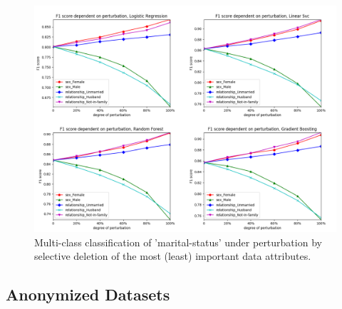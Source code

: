 \documentclass{llncs}
\begin{document}
\begin{figure}[!h]
	\centering
	\includegraphics[width=1\textwidth]{figures/perturbation/adults_marital_status/perturb_marital_combined}
	\caption{Multi-class classification of 'marital-status' under perturbation by selective deletion of the most (least) important data attributes.}
	\label{fig:results_perturbation_marital_status}
\end{figure}



\subsection{Anonymized Datasets}
\label{ssect:anonymized_ds}

\end{document}
